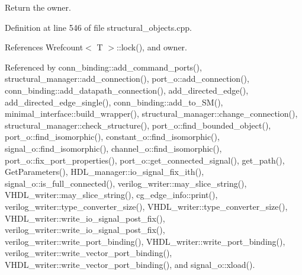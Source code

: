 Return the owner. 



Definition at line 546 of file structural\+\_\+objects.\+cpp.



References Wrefcount$<$ T $>$\+::lock(), and owner.



Referenced by conn\+\_\+binding\+::add\+\_\+command\+\_\+ports(), structural\+\_\+manager\+::add\+\_\+connection(), port\+\_\+o\+::add\+\_\+connection(), conn\+\_\+binding\+::add\+\_\+datapath\+\_\+connection(), add\+\_\+directed\+\_\+edge(), add\+\_\+directed\+\_\+edge\+\_\+single(), conn\+\_\+binding\+::add\+\_\+to\+\_\+\+S\+M(), minimal\+\_\+interface\+::build\+\_\+wrapper(), structural\+\_\+manager\+::change\+\_\+connection(), structural\+\_\+manager\+::check\+\_\+structure(), port\+\_\+o\+::find\+\_\+bounded\+\_\+object(), port\+\_\+o\+::find\+\_\+isomorphic(), constant\+\_\+o\+::find\+\_\+isomorphic(), signal\+\_\+o\+::find\+\_\+isomorphic(), channel\+\_\+o\+::find\+\_\+isomorphic(), port\+\_\+o\+::fix\+\_\+port\+\_\+properties(), port\+\_\+o\+::get\+\_\+connected\+\_\+signal(), get\+\_\+path(), Get\+Parameters(), H\+D\+L\+\_\+manager\+::io\+\_\+signal\+\_\+fix\+\_\+ith(), signal\+\_\+o\+::is\+\_\+full\+\_\+connected(), verilog\+\_\+writer\+::may\+\_\+slice\+\_\+string(), V\+H\+D\+L\+\_\+writer\+::may\+\_\+slice\+\_\+string(), cg\+\_\+edge\+\_\+info\+::print(), verilog\+\_\+writer\+::type\+\_\+converter\+\_\+size(), V\+H\+D\+L\+\_\+writer\+::type\+\_\+converter\+\_\+size(), V\+H\+D\+L\+\_\+writer\+::write\+\_\+io\+\_\+signal\+\_\+post\+\_\+fix(), verilog\+\_\+writer\+::write\+\_\+io\+\_\+signal\+\_\+post\+\_\+fix(), verilog\+\_\+writer\+::write\+\_\+port\+\_\+binding(), V\+H\+D\+L\+\_\+writer\+::write\+\_\+port\+\_\+binding(), verilog\+\_\+writer\+::write\+\_\+vector\+\_\+port\+\_\+binding(), V\+H\+D\+L\+\_\+writer\+::write\+\_\+vector\+\_\+port\+\_\+binding(), and signal\+\_\+o\+::xload().

